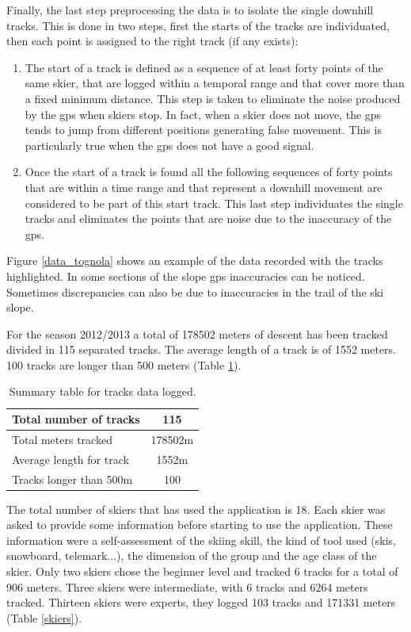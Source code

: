 \documentclass[12pt,a4paper,twoside]{book}
\begin{document}
Finally, the last step preprocessing the data is to isolate the single downhill tracks. This is done in two steps, first the starts of the tracks are individuated, then each point is assigned to the right track (if any exists):
\begin{enumerate}
\item The start of a track is defined as a sequence of at least forty points of the same skier, that are logged within a temporal range and that cover more than a fixed minimum distance. This step is taken to eliminate the noise produced by the gps when skiers stop. In fact, when a skier does not move, the gps tends to jump from different positions generating false movement. This is particularly true when the gps does not have a good signal.
\item Once the start of a track is found all the following sequences of forty points that are within a time range and that represent a downhill movement are considered to be part of this start track. This last step individuates the single tracks and eliminates the points that are noise due to the inaccuracy of the gps.
\end{enumerate}

Figure \ref{data_tognola} shows an example of the data recorded with the tracks highlighted. In some sections of the slope gps inaccuracies can be noticed. Sometimes discrepancies can also be due to inaccuracies in the trail of the ski slope.

For the season 2012/2013 a total of 178502 meters of descent has been tracked divided in 115 separated tracks. The average length of a track is of 1552 meters. 100 tracks are longer than 500 meters (Table \ref{descendts}).

\begin{table}[!h]
  \centering
  \begin{tabular}{ | l | c | }
    \hline
    Total number of tracks & 115 \\ \hline
    Total meters tracked & 178502m \\ \hline
    Average length for track & 1552m \\ \hline
    Tracks longer than 500m & 100 \\
    \hline
  \end{tabular}
  \caption{Summary table for tracks data logged.}
  \label{descendts}
\end{table}

The total number of skiers that has used the application is 18. Each skier was asked to provide some information before starting to use the application. These information were a self-assessment of the skiing skill, the kind of tool used (skis, snowboard, telemark...), the dimension of the group and the age class of the skier. Only two skiers chose the beginner level and tracked 6 tracks for a total of 906 meters. Three skiers were intermediate, with 6 tracks and 6264 meters tracked. Thirteen skiers were experts, they logged 103 tracks and 171331 meters (Table \ref{skiers}).
\end{document}

